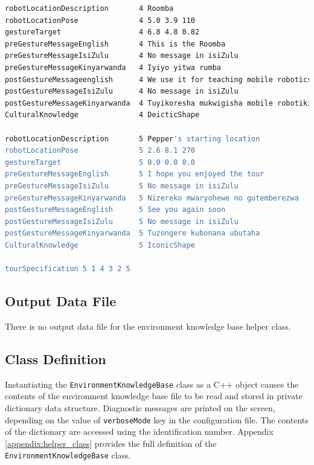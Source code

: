 \documentclass{CSSRforAfrica}
\begin{document}
\begin{table}[H]
\begin{lstlisting}[style=withoutNumbering, language=bash]
robotLocationDescription       4 Roomba
robotLocationPose              4 5.0 3.9 110
gestureTarget                  4 6.8 4.8 0.82
preGestureMessageEnglish       4 This is the Roomba
preGestureMessageIsiZulu       4 No message in isiZulu
preGestureMessageKinyarwanda   4 Iyiyo yitwa rumba
postGestureMessageenglish      4 We use it for teaching mobile robotics
postGestureMessageIsiZulu      4 No message in isiZulu
postGestureMessageKinyarwanda  4 Tuyikoresha mukwigisha mobile robotikisi
CulturalKnowledge              4 DeicticShape

robotLocationDescription       5 Pepper's starting location
robotLocationPose              5 2.6 8.1 270
gestureTarget                  5 0.0 0.0 0.0
preGestureMessageEnglish       5 I hope you enjoyed the tour
preGestureMessageIsiZulu       5 No message in isiZulu
preGestureMessageKinyarwanda   5 Nizereko mwaryohewe no gutemberezwa
postGestureMessageEnglish      5 See you again soon
postGestureMessageIsiZulu      5 No message in isiZulu
postGestureMessageKinyarwanda  5 Tuzongere kubonana ubutaha
CulturalKnowledge              5 IconicShape

tourSpecification 5 1 4 3 2 5

\end{lstlisting}
\vspace{-5mm}
\end{table}
 

\subsection{Output Data File}
There is no output data file for the environment knowledge base helper class. 


\subsection{Class Definition}
Instantiating the {\tt\small EnvironmentKnowledgeBase} class as a C++ object causes the contents of the  environment knowledge base file to be read and stored in private  dictionary data structure. Diagnostic messages are printed on the screen, depending on the value of \texttt{verboseMode} key in the configuration file. The contents of the dictionary are accessed using the identification number. 
Appendix \ref{appendix:helper_class} provides the full definition of the {\tt\small EnvironmentKnowledgeBase} class.
\end{document}
